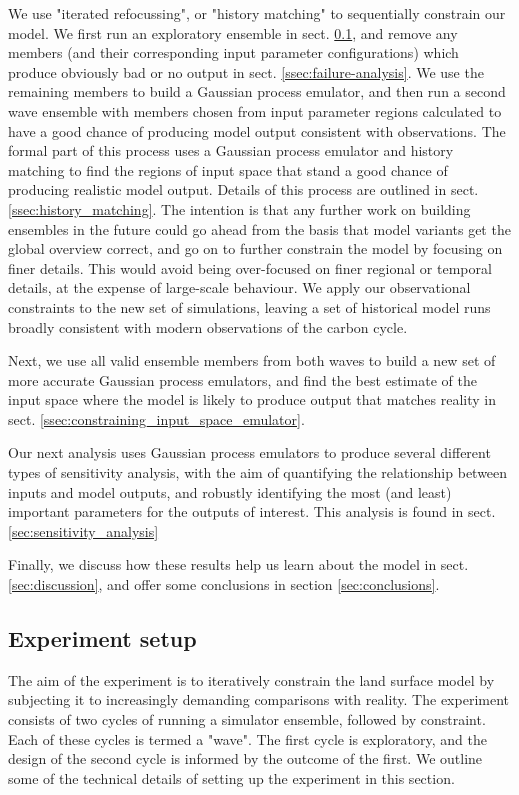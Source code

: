 \documentclass[gmd, manuscript]{copernicus}
\begin{document}
We use "iterated refocussing", or "history matching" to sequentially constrain our model.  We first run an exploratory ensemble in sect. \ref{ssec:experiment_setup}, and remove any members (and their corresponding input parameter configurations) which produce obviously bad or no output in sect. \ref{ssec:failure-analysis}. We use the remaining members to build a Gaussian process emulator, and then run a second wave ensemble with members chosen from input parameter regions calculated to have a good chance of producing model output consistent with observations. The formal part of this process uses a Gaussian process emulator and history matching to find the regions of input space that stand a good chance of producing realistic model output. Details of this process are outlined in sect. \ref{ssec:history_matching}. The intention is that any further work on building ensembles in the future could go ahead from the basis that model variants get the global overview correct, and go on to further constrain the model by focusing on finer details. This would avoid being over-focused on finer regional or temporal details, at the expense of large-scale behaviour. We apply our observational  constraints to the new set of simulations, leaving a set of historical model runs broadly consistent with modern observations of the carbon cycle.

Next, we use all valid ensemble members from both waves to build a new set of more accurate Gaussian process emulators, and find the best estimate of the input space where the model is likely to produce output that matches reality in sect. \ref{ssec:constraining_input_space_emulator}.

Our next analysis uses Gaussian process emulators to produce several different types of sensitivity analysis, with the aim of quantifying the relationship between inputs and model outputs, and robustly identifying the most (and least) important parameters for the outputs of interest. This analysis is found in sect. \ref{sec:sensitivity_analysis}

Finally, we discuss how these results help us learn about the model in sect. \ref{sec:discussion}, and offer some conclusions in section \ref{sec:conclusions}.

\subsection {Experiment setup}\label{ssec:experiment_setup}

The aim of the experiment is to iteratively constrain the land surface model by subjecting it to increasingly demanding comparisons with reality. The experiment consists of two cycles of running a simulator ensemble, followed by constraint. Each of these cycles is termed a "wave". The first cycle is exploratory, and the design of the second cycle is informed by the outcome of the first.  We outline some of the technical details of setting up the experiment in this section.
\end{document}
